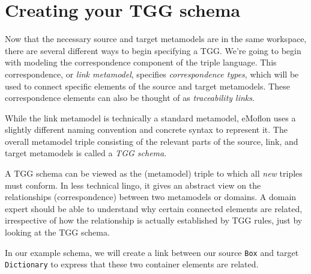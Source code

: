 \newpage
\hypertarget{TGGSchema}{}
\section{Creating your TGG schema}
\genHeader

Now that the necessary source and target metamodels are in the same workspace, there are several different ways to begin specifying a TGG. We're going to begin
with modeling the correspondence component of the triple language. This correspondence, or \emph{link metamodel}, specifies
\emph{correspondence types}, which will be used to connect specific elements of the source and target metamodels. These
correspondence elements can also be thought of as \emph{traceability links}.

While the link metamodel is technically a standard metamodel, eMoflon uses a slightly different naming convention and concrete syntax to represent it. The
overall metamodel triple consisting of the relevant parts of the source, link, and target metamodels is called a \emph{TGG schema}.

A TGG schema can be viewed as the (metamodel) triple to which all \emph{new} triples must conform. In less technical lingo, it gives an abstract view on the
relationships (correspondence) between two metamodels or domains. A domain expert should be able to understand why certain connected elements are related,
irrespective of how the relationship is actually established by TGG rules, just by looking at the TGG schema. 

In our example schema, we will create a link between our source \texttt{Box} and target \texttt{Dictionary} to express that these two container elements are
related.





